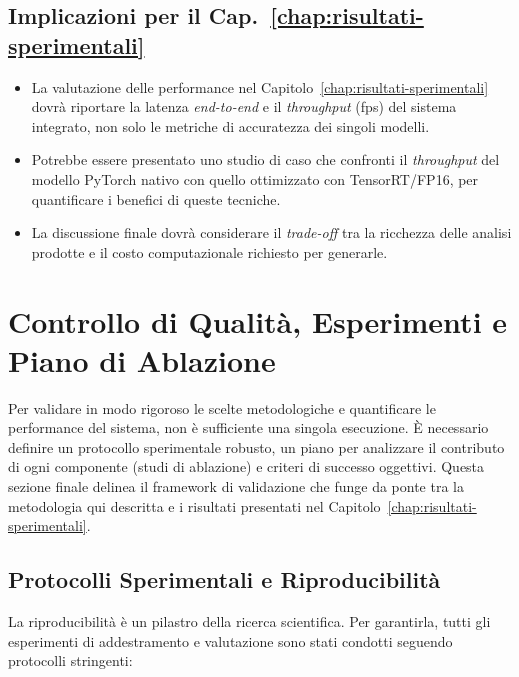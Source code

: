 \documentclass[12pt,a4paper,openright,twoside]{book}
\begin{document}
\subsection*{Implicazioni per il Cap.~\ref{chap:risultati-sperimentali}}

\begin{itemize}
  \item La valutazione delle performance nel Capitolo~\ref{chap:risultati-sperimentali} dovrà riportare la latenza \emph{end-to-end} e 
  il \emph{throughput} (\ac{fps}) del sistema integrato, non solo le metriche di accuratezza dei singoli modelli.
  \item Potrebbe essere presentato uno studio di caso che confronti il \emph{throughput} del modello PyTorch nativo con quello ottimizzato con 
  TensorRT/FP16, per quantificare i benefici di queste tecniche.
  \item La discussione finale dovrà considerare il \emph{trade-off} tra la ricchezza delle analisi prodotte e il costo computazionale richiesto 
  per generarle.
\end{itemize}

\section{Controllo di Qualità, Esperimenti e Piano di Ablazione}
\label{sec:controllo-qualita-esperimenti}

Per validare in modo rigoroso le scelte metodologiche e quantificare le performance del sistema, non è sufficiente una singola esecuzione.
È necessario definire un protocollo sperimentale robusto, un piano per analizzare il contributo di ogni componente (studi di ablazione)
e criteri di successo oggettivi. Questa sezione finale delinea il framework di validazione che funge da ponte tra la metodologia qui
descritta e i risultati presentati nel Capitolo~\ref{chap:risultati-sperimentali}.

\subsection{Protocolli Sperimentali e Riproducibilità}
\label{sec:protocolli-sperimentali}

La riproducibilità è un pilastro della ricerca scientifica. Per garantirla, tutti gli esperimenti di addestramento e valutazione sono stati
condotti seguendo protocolli stringenti:
\end{document}
